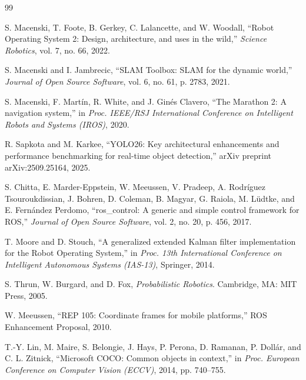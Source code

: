 \documentclass[a4paper,12pt]{report}
\newcounter{savedfront}
\newcommand{\resumefrontpage}{%
  \clearpage
  \pagenumbering{thaialph}\setcounter{page}{\value{savedfront}}}
\begin{document}
\resumefrontpage

\begin{thebibliography}{99}

S. Macenski, T. Foote, B. Gerkey, C. Lalancette, and W. Woodall,
``Robot Operating System 2: Design, architecture, and uses in the wild,''
\textit{Science Robotics}, vol. 7, no. 66, 2022.

S. Macenski and I. Jambrecic,
``SLAM Toolbox: SLAM for the dynamic world,''
\textit{Journal of Open Source Software}, vol. 6, no. 61, p. 2783, 2021.

S. Macenski, F. Mart\'in, R. White, and J. Gin\'es Clavero,
``The Marathon 2: A navigation system,''
in \textit{Proc. IEEE/RSJ International Conference on Intelligent Robots
and Systems (IROS)}, 2020.

R. Sapkota and M. Karkee,
``YOLO26: Key architectural enhancements and performance benchmarking
for real-time object detection,''
arXiv preprint arXiv:2509.25164, 2025.

S. Chitta, E. Marder-Eppstein, W. Meeussen, V. Pradeep, A. Rodr\'iguez Tsouroukdissian,
J. Bohren, D. Coleman, B. Magyar, G. Raiola, M. L\"udtke, and E. Fern\'andez Perdomo,
``ros\_control: A generic and simple control framework for ROS,''
\textit{Journal of Open Source Software}, vol. 2, no. 20, p. 456, 2017.

T. Moore and D. Stouch,
``A generalized extended Kalman filter implementation for the Robot Operating System,''
in \textit{Proc. 13th International Conference on Intelligent Autonomous Systems (IAS-13)},
Springer, 2014.

S. Thrun, W. Burgard, and D. Fox,
\textit{Probabilistic Robotics}. Cambridge, MA: MIT Press, 2005.

W. Meeussen,
``REP 105: Coordinate frames for mobile platforms,''
ROS Enhancement Proposal, 2010.

T.-Y. Lin, M. Maire, S. Belongie, J. Hays, P. Perona, D. Ramanan, P. Doll\'ar,
and C. L. Zitnick,
``Microsoft COCO: Common objects in context,''
in \textit{Proc. European Conference on Computer Vision (ECCV)}, 2014, pp. 740--755.


\end{thebibliography}
\end{document}
